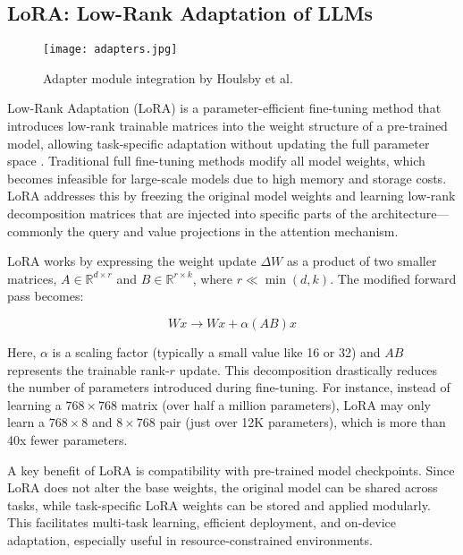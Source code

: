 \subsection{LoRA: Low-Rank Adaptation of LLMs}

\begin{figure}[t]
  \centering
  \texttt{[image: adapters.jpg]}
  \caption{Adapter module integration by Houlsby et al. \cite{houlsby2019parameter}}
\end{figure}

Low-Rank Adaptation (LoRA) is a parameter-efficient fine-tuning method that introduces
low-rank trainable matrices into the weight structure of a pre-trained model, allowing
task-specific adaptation without updating the full parameter space \cite{hu2022lora}. Traditional full
fine-tuning methods modify all model weights, which becomes infeasible for large-scale
models due to high memory and storage costs. LoRA addresses this by freezing the
original model weights and learning low-rank decomposition matrices that are injected
into specific parts of the architecture—commonly the query and value projections in the
attention mechanism.

LoRA works by expressing the weight update $\Delta W$ as a product of two smaller matrices,
$A \in \mathbb{R}^{d \times r}$ and $B \in \mathbb{R}^{r \times k}$, where $r \ll \min(d, k)$. The modified forward pass becomes:

\begin{equation}
  W x \rightarrow W x + \alpha (AB) x
  \label{lorapass}
\end{equation}

Here, $\alpha$ is a scaling factor (typically a small value like 16 or 32) and $AB$ represents the
trainable rank-$r$ update. This decomposition drastically reduces the number of parameters
introduced during fine-tuning. For instance, instead of learning a $768 \times 768$ matrix (over
half a million parameters), LoRA may only learn a $768 \times 8$ and $8 \times 768$ pair (just over
12K parameters), which is more than 40x fewer parameters.

A key benefit of LoRA is compatibility with pre-trained model checkpoints. Since
LoRA does not alter the base weights, the original model can be shared across tasks,
while task-specific LoRA weights can be stored and applied modularly. This facilitates
multi-task learning, efficient deployment, and on-device adaptation, especially useful in
resource-constrained environments.

